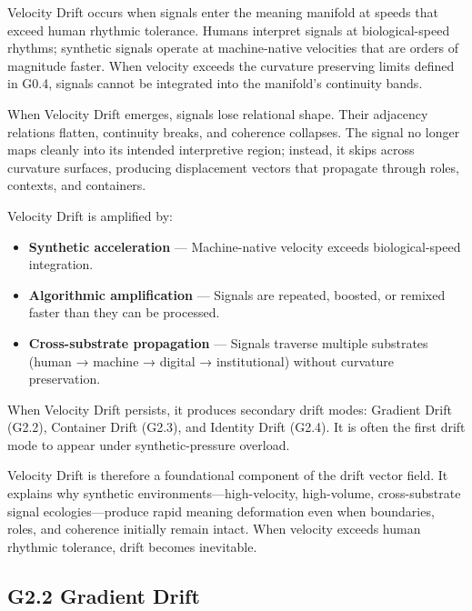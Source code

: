 \noindent Velocity Drift occurs when signals enter the meaning manifold at speeds
that exceed human rhythmic tolerance. Humans interpret signals at
biological-speed rhythms; synthetic signals operate at machine-native velocities
that are orders of magnitude faster. When velocity exceeds the curvature
preserving limits defined in G0.4, signals cannot be integrated into the
manifold’s continuity bands.

\medskip

\noindent When Velocity Drift emerges, signals lose relational shape. Their
adjacency relations flatten, continuity breaks, and coherence collapses. The
signal no longer maps cleanly into its intended interpretive region; instead, it
skips across curvature surfaces, producing displacement vectors that propagate
through roles, contexts, and containers.

\medskip

\noindent Velocity Drift is amplified by:

\begin{itemize}[leftmargin=1.2cm]
    \item \textbf{Synthetic acceleration} — Machine-native velocity exceeds
    biological-speed integration.
    \item \textbf{Algorithmic amplification} — Signals are repeated, boosted, or
    remixed faster than they can be processed.
    \item \textbf{Cross-substrate propagation} — Signals traverse multiple
    substrates (human → machine → digital → institutional) without curvature
    preservation.
\end{itemize}

\medskip

\noindent When Velocity Drift persists, it produces secondary drift modes:
Gradient Drift (G2.2), Container Drift (G2.3), and Identity Drift (G2.4). It is
often the first drift mode to appear under synthetic-pressure overload.

\medskip

\noindent Velocity Drift is therefore a foundational component of the drift
vector field. It explains why synthetic environments—high-velocity, high-volume,
cross-substrate signal ecologies—produce rapid meaning deformation even when
boundaries, roles, and coherence initially remain intact. When velocity exceeds
human rhythmic tolerance, drift becomes inevitable.

\subsection*{G2.2 Gradient Drift}

